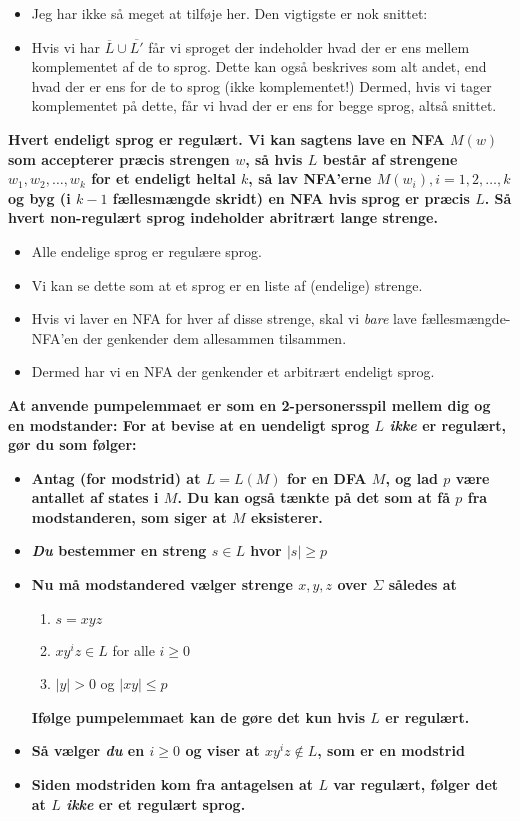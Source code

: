 \begin{itemize}
	\item Jeg har ikke så meget at tilføje her. Den vigtigste er nok snittet:
	\item Hvis vi har $\overline{L} \cup \overline{L'}$ får vi sproget der indeholder hvad der er ens mellem komplementet af de to sprog. Dette kan også beskrives som alt andet, end hvad der er ens for de to sprog (ikke komplementet!) Dermed, hvis vi tager komplementet på dette, får vi hvad der er ens for begge sprog, altså snittet.
\end{itemize}
\noindent
\textbf{Hvert endeligt sprog er regulært. Vi kan sagtens lave en NFA $M(w)$ som accepterer præcis strengen $w$, så hvis $L$ består af strengene $w_{1}, w_{2}, \ldots, w_{k}$ for et endeligt heltal $k$, så lav NFA'erne $M(w_{i}), i = 1, 2, \ldots, k$ og byg (i $k-1$ fællesmængde skridt) en NFA hvis sprog er præcis $L$. Så hvert non-regulært sprog indeholder abritrært lange strenge.}
\begin{itemize}
	\item Alle endelige sprog er regulære sprog.
	\item Vi kan se dette som at et sprog er en liste af (endelige) strenge.
	\item Hvis vi laver en NFA for hver af disse strenge, skal vi \textit{bare} lave fællesmængde-NFA'en der genkender dem allesammen tilsammen.
	\item Dermed har vi en NFA der genkender et arbitrært endeligt sprog.
\end{itemize}

\noindent
\textbf{At anvende pumpelemmaet er som en 2-personersspil mellem dig og en modstander: For at bevise at en uendeligt sprog $L$ \textit{ikke} er regulært, gør du som følger:}

\begin{itemize}
	\item \textbf{Antag (for modstrid) at $L = L(M)$ for en DFA $M$, og lad $p$ være antallet af states i $M$. Du kan også tænkte på det som at få $p$ fra modstanderen, som siger at $M$ eksisterer. }
	\item \textbf{\textit{Du} bestemmer en streng $s \in L$ hvor $|s| \geq p$}
	\item \textbf{Nu må modstandered vælger strenge $x,y,z$ over $\Sigma$ således at}
	      \begin{enumerate}
		      \item $s = xyz$
		      \item $xy^{i}z \in L$ for alle $i \geq 0$
		      \item $|y| > 0$ og $|xy| \leq p$
	      \end{enumerate}
	      \textbf{Ifølge pumpelemmaet kan de gøre det kun hvis $L$ er regulært.}
	\item \textbf{Så vælger \textit{du} en $i \geq 0$ og viser at $xy^{i}z \notin L$, som er en modstrid}
	\item \textbf{Siden modstriden kom fra antagelsen at $L$ var regulært, følger det at $L$ \textit{ikke} er et regulært sprog.}
\end{itemize}




